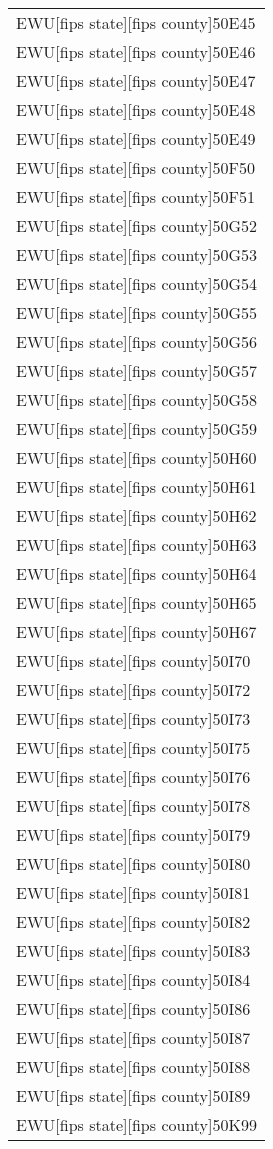 \begin{supertabular}{l}
EWU[fips state][fips county]50E45\\
EWU[fips state][fips county]50E46\\
EWU[fips state][fips county]50E47\\
EWU[fips state][fips county]50E48\\
EWU[fips state][fips county]50E49\\
EWU[fips state][fips county]50F50\\
EWU[fips state][fips county]50F51\\
EWU[fips state][fips county]50G52\\
EWU[fips state][fips county]50G53\\
EWU[fips state][fips county]50G54\\
EWU[fips state][fips county]50G55\\
EWU[fips state][fips county]50G56\\
EWU[fips state][fips county]50G57\\
EWU[fips state][fips county]50G58\\
EWU[fips state][fips county]50G59\\
EWU[fips state][fips county]50H60\\
EWU[fips state][fips county]50H61\\
EWU[fips state][fips county]50H62\\
EWU[fips state][fips county]50H63\\
EWU[fips state][fips county]50H64\\
EWU[fips state][fips county]50H65\\
EWU[fips state][fips county]50H67\\
EWU[fips state][fips county]50I70\\
EWU[fips state][fips county]50I72\\
EWU[fips state][fips county]50I73\\
EWU[fips state][fips county]50I75\\
EWU[fips state][fips county]50I76\\
EWU[fips state][fips county]50I78\\
EWU[fips state][fips county]50I79\\
EWU[fips state][fips county]50I80\\
EWU[fips state][fips county]50I81\\
EWU[fips state][fips county]50I82\\
EWU[fips state][fips county]50I83\\
EWU[fips state][fips county]50I84\\
EWU[fips state][fips county]50I86\\
EWU[fips state][fips county]50I87\\
EWU[fips state][fips county]50I88\\
EWU[fips state][fips county]50I89\\
EWU[fips state][fips county]50K99\\
\end{supertabular}
\onecolumn
